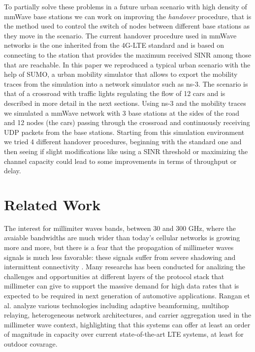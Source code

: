 \documentclass[conference,10pt]{IEEEtran}
\begin{document}
To partially solve these problems in a future urban scenario with high density of mmWave base stations we can work on improving the \emph{handover} procedure, that is the method used to control the switch of nodes between different base stations as they move in the scenario. The current handover procedure used in mmWave networks is the one inherited from the 4G-LTE standard and is based on connecting to the station that provides the maximum received SINR among those that are reachable. In this paper we reproduced a typical urban scenario with the help of SUMO, a urban mobility simulator that allows to export the mobility traces from the simulation into a network simulator such as ns-3. The scenario is that of a crossroad with traffic lights regulating the flow of 12 cars and is described in more detail in the next sections. Using ns-3 and the mobility traces we simulated a mmWave network with 3 base stations at the sides of the road and 12 nodes (the cars) passing through the crossroad and continuously receiving UDP packets from the base stations. Starting from this simulation environment we tried 4 different handover procedures, beginning with the standard one and then seeing if slight modifications like using a SINR threshold or maximizing the channel capacity could lead to some improvements in terms of throughput or delay. 



\section{Related Work}\label{sec:sota}

The interest for millimiter waves bands, between 30 and 300 GHz, where the avaiable bandwidths are much wider than today's cellular networks is growing more and more, but there is a fear that the propagation of millimeter waves signals is much less favorable: these signals suffer from severe shadowing and intermittent connectivity \cite{mmwwicom} \cite{mmwcomsy}. Many researchs has been conducted for analizing the challenges and opportunities at different layers of the protocol stack that millimeter can give to support the massive demand for high data rates that is expected to be required in next generation of automotive applications.
Rangan et al. \cite{mmwpac} analyze various technologies including adaptive beamforming, multihop relaying, heterogeneous network architectures, and carrier aggregation used in the millimeter wave context, highlighting that this systems can offer at least an order of magnitude in capacity over current state-of-the-art LTE systems, at least for outdoor covarage.
\end{document}
